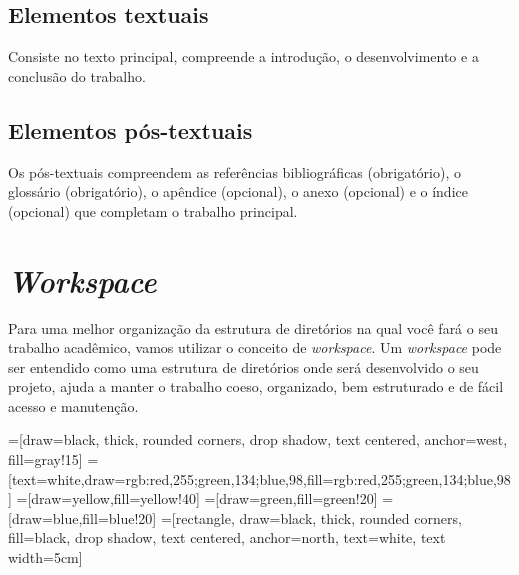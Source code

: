 \subsection{Elementos textuais}

Consiste no texto principal, compreende a introdução, o desenvolvimento e a conclusão do trabalho.

\subsection{Elementos pós-textuais}

Os pós-textuais compreendem as referências bibliográficas (obrigatório), o glossário (obrigatório), o apêndice (opcional), o anexo (opcional) e o índice (opcional) que completam o trabalho principal.

\section{\emph{Workspace}}

Para uma melhor organização da estrutura de diretórios na qual você fará o seu trabalho acadêmico, vamos utilizar o conceito de \emph{workspace}. Um \emph{workspace} pode ser entendido como uma estrutura de diretórios onde será desenvolvido o seu projeto, ajuda a manter o trabalho coeso, organizado, bem estruturado e de fácil acesso e manutenção.

\bgroup
\usetikzlibrary{trees}
=[draw=black, thick, rounded corners, drop shadow, text centered, anchor=west, fill=gray!15]
=[text=white,draw={rgb:red,255;green,134;blue,98},fill={rgb:red,255;green,134;blue,98}]
=[draw=yellow,fill=yellow!40]
=[draw=green,fill=green!20]
=[draw=blue,fill=blue!20]
=[rectangle, draw=black, thick, rounded corners, fill=black, drop shadow,
        text centered, anchor=north, text=white, text width=5cm]

